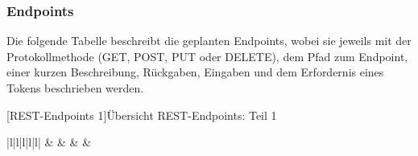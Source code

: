 \subsubsection{Endpoints}
\label{chapter:endpoints}

Die folgende Tabelle beschreibt die geplanten Endpoints, wobei  sie jeweils mit der Protokollmethode (GET, POST, PUT oder DELETE), dem Pfad zum Endpoint, einer kurzen Beschreibung, Rückgaben, Eingaben und dem Erfordernis eines Tokens beschrieben werden.

[REST-Endpoints 1]{Übersicht REST-Endpoints: Teil 1}
\label{table:endpoints1}
\begin{table}
	\centering
	\begin{tabular}{|l|l|l|l|l|}
		\hline
		 &                                                   &                                                                   &  &                                                                           \\ \hline
		

\end{tabular}
\end{table}
